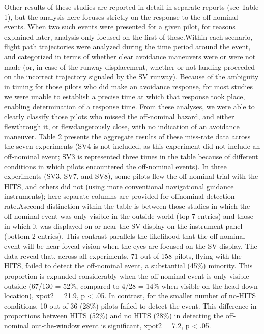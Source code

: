 \documentclass[utf8,bachelor,manualbib]{gradu3}
\begin{document}
Other results of these studies are reported in detail in separate reports (see Table 1),
but the analysis here focuses strictly on the response to the off-nominal events.
When two such events were presented for a given pilot, for reasons explained later,
analysis only focused on the first of these.Within each scenario, flight path trajectories
were analyzed during the time period around the event, and categorized in
terms of whether clear avoidance maneuvers were or were not made (or, in case of
the runway displacement, whether or not landing proceeded on the incorrect trajectory
signaled by the SV runway). Because of the ambiguity in timing for those
pilots who did make an avoidance response, for most studies we were unable to establish
a precise time at which that response took place, enabling determination of
a response time. From these analyses, we were able to clearly classify those pilots
who missed the off-nominal hazard, and either flewthrough it, or flewdangerously
close, with no indication of an avoidance maneuver. Table 2 presents the aggregate
results of these miss-rate data across the seven experiments (SV4 is not included,
as this experiment did not include an off-nominal event; SV3 is represented three
times in the table because of different conditions in which pilots encountered the
off-nominal events). In three experiments (SV3, SV7, and SV8), some pilots flew
the off-nominal trial with the HITS, and others did not (using more conventional
navigational guidance instruments); here separate columns are provided for offnominal
detection rate.Asecond distinction within the table is between those studies
in which the off-nominal event was only visible in the outside world (top 7
entries) and those in which it was displayed on or near the SV display on the instrument
panel (bottom 2 entries). This contrast parallels the likelihood that the
off-nominal event will be near foveal vision when the eyes are focused on the SV
display.
The data reveal that, across all experiments, 71 out of 158 pilots, flying with the
HITS, failed to detect the off-nominal event, a substantial (45\%) minority. This
proportion is expanded considerably when the off-nominal event is only visible outside (67/130 = 52\%, compared to 4/28 = 14\% when visible on the head down
location), xpot2 = 21.9, p < .05. In contrast, for the smaller number of no-HITS conditions,
10 out of 36 (28\%) pilots failed to detect the event. This difference in proportions
between HITS (52\%) and no HITS (28\%) in detecting the off-nominal
out-the-window event is significant, xpot2 = 7.2, p < .05.
\end{document}
